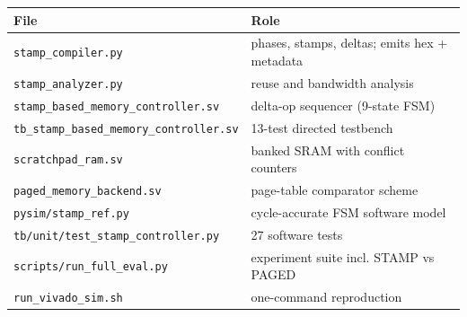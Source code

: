 \documentclass[11pt,a4paper]{article}
\begin{document}
\begin{center}
\small
\begin{tabular}{@{}ll@{}}
\toprule
\textbf{File} & \textbf{Role} \\
\midrule
\texttt{stamp\_compiler.py} & phases, stamps, deltas; emits hex + metadata \\
\texttt{stamp\_analyzer.py} & reuse and bandwidth analysis \\
\texttt{stamp\_based\_memory\_controller.sv} & delta-op sequencer (9-state FSM) \\
\texttt{tb\_stamp\_based\_memory\_controller.sv} & 13-test directed testbench \\
\texttt{scratchpad\_ram.sv} & banked SRAM with conflict counters \\
\texttt{paged\_memory\_backend.sv} & page-table comparator scheme \\
\texttt{pysim/stamp\_ref.py} & cycle-accurate FSM software model \\
\texttt{tb/unit/test\_stamp\_controller.py} & 27 software tests \\
\texttt{scripts/run\_full\_eval.py} & experiment suite incl. STAMP vs PAGED \\
\texttt{run\_vivado\_sim.sh} & one-command reproduction \\
\bottomrule
\end{tabular}
\end{center}
\end{document}
